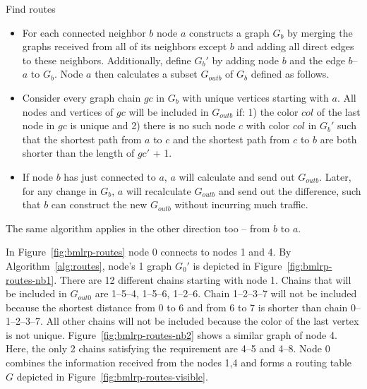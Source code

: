 \documentclass[conference]{IEEEtran}
\theoremstyle{definition}
\begin{document}
\begin{algorithm}
  \caption{Find routes}
  \begin{itemize}
  
 \item   For each connected neighbor $b$ node $a$ constructs a graph $G_b$ by merging the graphs received from all of its neighbors except $b$ and adding all direct edges to these neighbors. Additionally, define $G_b'$ by adding node $b$ and the edge $b$--$a$ to $G_b$. Node $a$ then calculates a subset $G_{outb}$ of $G_b$ defined as follows.

 \item    Consider every graph chain $gc$ in $G_b$ with unique vertices starting with $a$. All nodes and vertices of $gc$ will be included in $G_{outb}$ if: 1) the color $col$ of the last node in $gc$ is unique and 2) there is no such node $c$ with color $col$ in $G_b'$ such that the shortest path from $a$ to $c$ and the shortest path from $c$ to $b$ are both shorter than the length of $gc'$ + 1.

\item    If node $b$ has just connected to $a$, $a$ will calculate and send out $G_{outb}$. Later, for any change in $G_b$, $a$ will recalculate $G_{outb}$ and send out the difference, such that $b$ can construct the new $G_{outb}$ without incurring much traffic.

\end{itemize}

    The same algorithm applies in the other direction too -- from $b$ to $a$.

    \label{alg:routes}
\end{algorithm}

In Figure~\ref{fig:bmlrp-routes} node 0 connects to nodes 1 and 4. By Algorithm~\ref{alg:routes}, node's 1 graph $G_0'$ is depicted in Figure~\ref{fig:bmlrp-routes-nb1}. There are 12 different chains starting with node 1. Chains that will be included in $G_{out0}$ are 1--5--4, 1--5--6, 1--2--6. Chain 1--2--3--7 will not be included because the shortest distance from 0 to 6 and from 6 to 7 is shorter than chain 0--1--2--3--7. All other chains will not be included because the color of the last vertex is not unique. Figure~\ref{fig:bmlrp-routes-nb2} shows a similar graph of node 4. Here, the only 2 chains satisfying the requirement are 4--5 and 4--8. Node 0 combines the information received from the nodes 1,4 and forms a routing table $G$ depicted in Figure~\ref{fig:bmlrp-routes-visible}.
\end{document}
